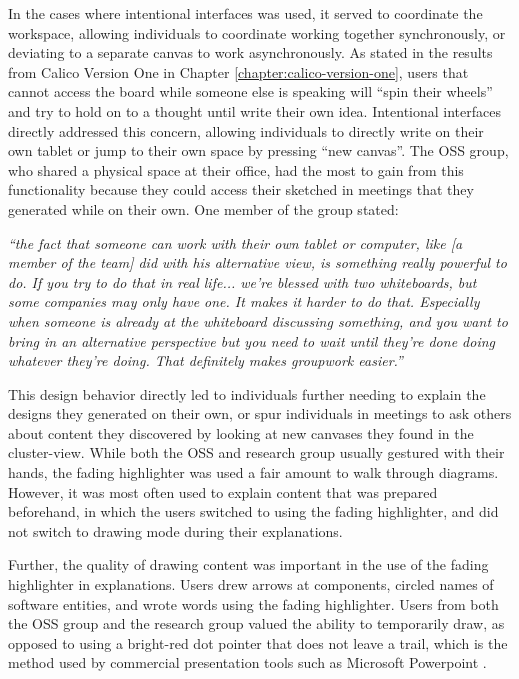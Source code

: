 In the cases where intentional interfaces was used, it served to coordinate the workspace, allowing individuals to coordinate working together synchronously, or deviating to a separate canvas to work asynchronously. As stated in the results from Calico Version One in Chapter \ref{chapter:calico-version-one}, users that cannot access the board while someone else is speaking will ``spin their wheels'' and try to hold on to a thought until write their own idea. Intentional interfaces directly addressed this concern, allowing individuals to directly write on their own tablet or jump to their own space by pressing ``new canvas''. The OSS group, who shared a physical space at their office, had the most to gain from this functionality because they could access their sketched in meetings that they generated while on their own. One member of the group stated:

\begin{myindentpar}{1cm}
\emph{``the fact that someone can work with their own tablet or computer, like [a member of the team] did with his alternative view, is something really powerful to do. If you try to do that in real life... we're blessed with two whiteboards, but some companies may only have one. It makes it harder to do that. Especially when someone is already at the whiteboard discussing something, and you want to bring in an alternative perspective but you need to wait until they're done doing whatever they're doing. That definitely makes groupwork easier.''}
\end{myindentpar}

This design behavior directly led to individuals further needing to explain the designs they generated on their own, or spur individuals in meetings to ask others about content they discovered by looking at new canvases they found in the cluster-view. While both the OSS and research group usually gestured with their hands, the fading highlighter was used a fair amount to walk through diagrams. However, it was most often used to explain content that was prepared beforehand, in which the users switched to using the fading highlighter, and did not switch to drawing mode during their explanations. 

Further, the quality of drawing content was important in the use of the fading highlighter in explanations. Users drew arrows at components, circled names of software entities, and wrote words using the fading highlighter. Users from both the OSS group and the research group valued the ability to temporarily draw, as opposed to using a bright-red dot pointer that does not leave a trail, which is the method used by commercial presentation tools such as Microsoft Powerpoint \cite{WinPowerPoint}.

